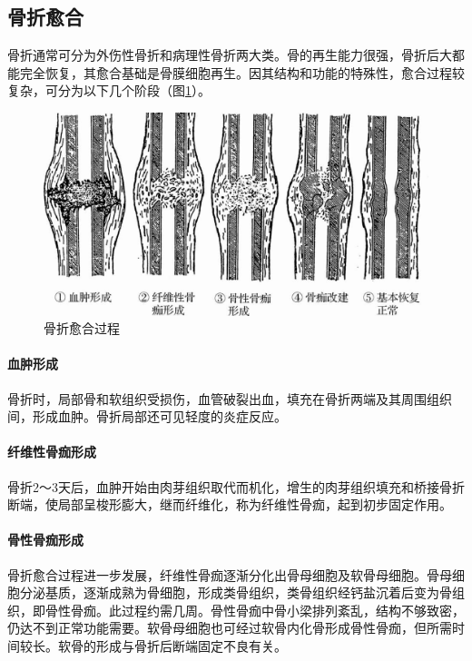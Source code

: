 \subsection{骨折愈合}

骨折通常可分为外伤性骨折和病理性骨折两大类。骨的再生能力很强，骨折后大都能完全恢复，其愈合基础是骨膜细胞再生。因其结构和功能的特殊性，愈合过程较复杂，可分为以下几个阶段（图\ref{fig2-9}）。

\begin{figure}[!htbp]
	\centering
	\includegraphics{./images/Image00032.jpg}
	\caption{骨折愈合过程}
	\label{fig2-9}
\end{figure}

\paragraph{血肿形成}
骨折时，局部骨和软组织受损伤，血管破裂出血，填充在骨折两端及其周围组织间，形成血肿。骨折局部还可见轻度的炎症反应。

\paragraph{纤维性骨痂形成}
骨折2～3天后，血肿开始由肉芽组织取代而机化，增生的肉芽组织填充和桥接骨折断端，使局部呈梭形膨大，继而纤维化，称为纤维性骨痂，起到初步固定作用。

\paragraph{骨性骨痂形成}
骨折愈合过程进一步发展，纤维性骨痂逐渐分化出骨母细胞及软骨母细胞。骨母细胞分泌基质，逐渐成熟为骨细胞，形成类骨组织，类骨组织经钙盐沉着后变为骨组织，即骨性骨痂。此过程约需几周。骨性骨痂中骨小梁排列紊乱，结构不够致密，仍达不到正常功能需要。软骨母细胞也可经过软骨内化骨形成骨性骨痂，但所需时间较长。软骨的形成与骨折后断端固定不良有关。

